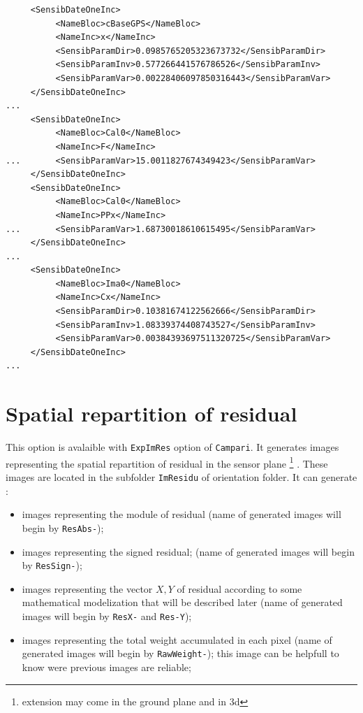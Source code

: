 \begin{verbatim}
     <SensibDateOneInc>
          <NameBloc>cBaseGPS</NameBloc>
          <NameInc>x</NameInc>
          <SensibParamDir>0.0985765205323673732</SensibParamDir>
          <SensibParamInv>0.577266441576786526</SensibParamInv>
          <SensibParamVar>0.00228406097850316443</SensibParamVar>
     </SensibDateOneInc>
...
     <SensibDateOneInc>
          <NameBloc>Cal0</NameBloc>
          <NameInc>F</NameInc>
...       <SensibParamVar>15.0011827674349423</SensibParamVar>
     </SensibDateOneInc>
     <SensibDateOneInc>
          <NameBloc>Cal0</NameBloc>
          <NameInc>PPx</NameInc>
...       <SensibParamVar>1.68730018610615495</SensibParamVar>
     </SensibDateOneInc>
...
     <SensibDateOneInc>
          <NameBloc>Ima0</NameBloc>
          <NameInc>Cx</NameInc>
          <SensibParamDir>0.10381674122562666</SensibParamDir>
          <SensibParamInv>1.08339374408743527</SensibParamInv>
          <SensibParamVar>0.00384393697511320725</SensibParamVar>
     </SensibDateOneInc>
...
\end{verbatim}


\section{Spatial repartition of residual}

This option is avalaible with {\tt ExpImRes} option of {\tt Campari}.
It generates images representing the spatial repartition of residual
in the sensor plane \footnote{extension may come in the ground plane and in $3$d} . 
These images are located in the subfolder
{\tt ImResidu} of orientation folder. It can generate :

\begin{itemize}
   \item images  representing the module of residual 
          (name of generated images will begin by {\tt ResAbs-});

   \item images  representing the signed residual;
          (name of generated images will begin by {\tt ResSign-});

   \item images  representing the vector $X,Y$ of residual according to some
         mathematical modelization that will be described later 
         (name of generated images will begin by {\tt ResX-} and {\tt Res-Y});

   \item images  representing the total weight accumulated in each pixel
          (name of generated images will begin by {\tt RawWeight-});
          this image can be helpfull to know were previous images are reliable;
   

\end{itemize}

